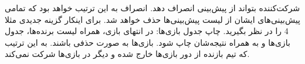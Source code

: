 
     شرکت‌کننده بتواند از پیش‌بینی انصراف دهد. انصراف به این ترتیب خواهد بود که تمامی پیش‌بینی‌های ایشان از لیست پیش‌بینی‌ها حذف خواهد شد. برای اینکار گزینه جدیدی مثلا 4 را در نظر بگیرید.
     چاپ جدول بازی‌ها: در انتهای بازی، همراه لیست برنده‌ها، جدول بازی‌ها و به همراه نتیجه‌شان چاپ شود.
     بازی‌ها به صورت حذفی باشند. به این ترتیب که تیم بازنده از دور بازی‌ها خارج شده و دیگر در بازی‌ها شرکت نمی‌کند.
